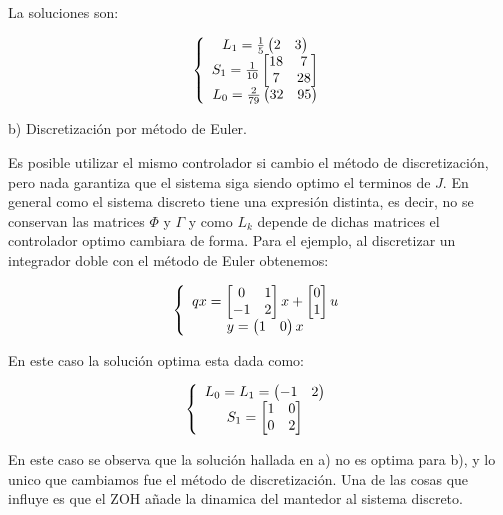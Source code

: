 La soluciones son: 

\begin{equation}
    \left\{ \begin{array}{c} 
        L_1 = \frac{1}{5} \begin{pmatrix}
            2 & 3
        \end{pmatrix} \\ 
        S_1 = \frac{1}{10} \begin{bmatrix}
            18 & 7 \\ 
            7 & 28
        \end{bmatrix} \\ 
        L_0 = \frac{2}{79} \begin{pmatrix}
            32 & 95
        \end{pmatrix}
     \end{array} \right.
\end{equation}

b) Discretización por método de Euler. 

Es posible utilizar el mismo controlador si cambio el método de discretización, pero nada garantiza que el sistema siga siendo optimo el terminos de $J$. 
En general como el sistema discreto tiene una expresión distinta, es decir, no se conservan las matrices $\Phi$ y $\Gamma$ y como $L_k$ depende de dichas 
matrices el controlador optimo cambiara de forma. Para el ejemplo, al discretizar un integrador doble con el método de Euler obtenemos: 

\begin{equation}
    \left\{ \begin{array}{c} 
        qx = \begin{bmatrix}
            0 & 1 \\ 
            -1 & 2
        \end{bmatrix}x + 
        \begin{bmatrix}
            0 \\ 1
        \end{bmatrix} u \\ 
        y = \begin{pmatrix}
            1 & 0
        \end{pmatrix}x
     \end{array} \right.
\end{equation}

En este caso la solución optima esta dada como: 

\begin{equation}
    \left\{ \begin{array}{c} 
        L_0 = L_1 =\begin{pmatrix}
            -1 & 2
       \end{pmatrix} \\ 
       S_1 = \begin{bmatrix}
           1 & 0 \\ 
           0 & 2
       \end{bmatrix}
     \end{array} \right.
\end{equation}

En este caso se observa que la solución hallada en a) no es optima para b), y lo unico que cambiamos fue el método de discretización. Una de las cosas 
que influye es que el ZOH añade la dinamica del mantedor al sistema discreto.